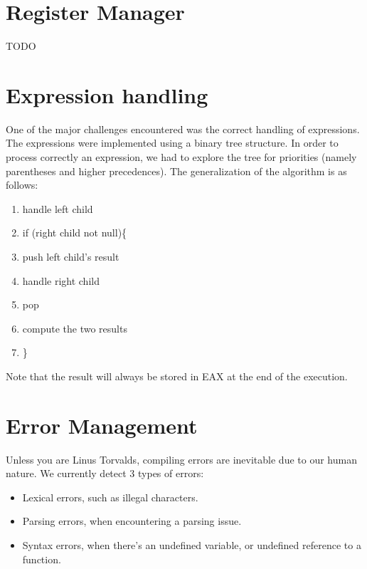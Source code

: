 \documentclass{article}
\begin{document}
\section{Register Manager}
TODO

\section{Expression handling}
One of the major challenges encountered was the correct handling of expressions.
The expressions were implemented using a binary tree structure. In order to process correctly an expression, we had to explore the tree for priorities (namely parentheses and higher precedences). The generalization of the algorithm is as follows:

\begin{enumerate}
\item handle left child
\item if (right child not null)\{
\item   push left child's result
\item   handle right child
\item   pop
\item   compute the two results
\item \}
\end{enumerate}

Note that the result will always be stored in EAX at the end of the execution.

\section{Error Management}
Unless you are Linus Torvalds, compiling errors are inevitable due to our human nature. We currently detect 3 types of errors:

\begin{itemize}
\item Lexical errors, such as illegal characters.
\item Parsing errors, when encountering a parsing issue.
\item Syntax errors, when there's an undefined variable, or undefined reference to a function.
\end{itemize}
\end{document}
